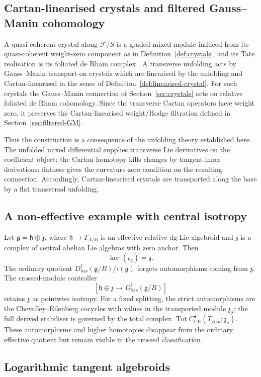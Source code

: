 \documentclass[11pt,reqno,a4paper,dvipsnames,x11names]{amsart}
\numberwithin{equation}{section}
\theoremstyle{plain}
\theoremstyle{definition}
\theoremstyle{remark}
\DeclareMathOperator{\Tot}{Tot}
\newcommand{\kk}{k}
\newcommand{\cF}{\mathcal F}
\newcommand{\g}{\mathfrak g}
\newcommand{\h}{\mathfrak h}
\newcommand{\z}{\mathfrak z}
\newcommand{\bas}{\mathrm{bas}}
\begin{document}
\subsection{Cartan-linearised crystals and filtered Gauss--Manin cohomology}

A quasi-coherent crystal along \(\cF/S\) is a graded-mixed module induced from its quasi-coherent weight-zero component as in Definition~\ref{def:crystals}, and its Tate realisation is its foliated de Rham complex \cite[Sections~3.1--3.2]{TV}. A transverse unfolding acts by Gauss--Manin transport on crystals which are linearised by the unfolding and Cartan-linearised in the sense of Definition~\ref{def:linearised-crystal}. For such crystals the Gauss--Manin connection of Section~\ref{sec:crystals} acts on relative foliated de Rham cohomology. Since the transverse Cartan operators have weight zero, it preserves the Cartan-linearised weight/Hodge filtration defined in Section~\ref{sec:filtered-GM}.

Thus the construction is a consequence of the unfolding theory established here. The unfolded mixed differential supplies transverse Lie derivatives on the coefficient object; the Cartan homotopy kills changes by tangent inner derivations; flatness gives the curvature-zero condition on the resulting connection. Accordingly, Cartan-linearised crystals are transported along the base by a flat transversal unfolding.

\subsection{A non-effective example with central isotropy}

Let \(\g=\h\oplus\z\), where \(\h\to T_{A/B}\) is an effective relative dg-Lie algebroid and \(\z\) is a complex of central abelian Lie algebras with zero anchor. Then
\[
 \ker(\iota_\g)=\z.
\]
The ordinary quotient \(D^1_{\bas}(\g/B)/\iota(\g)\) forgets automorphisms coming from \(\z\). The crossed-module controller
\[
 [\h\oplus\z\to D^1_{\bas}(\g/B)]
\]
retains \(\z\) as pointwise isotropy. For a fixed splitting, the strict automorphisms are the Chevalley--Eilenberg cocycles with values in the transported module \(\z_s\); the full derived stabiliser is governed by the total complex \(\Tot C^\bullet_{\mathrm{CE}}(T_{B/\kk};\z_s)\). These automorphisms and higher homotopies disappear from the ordinary effective quotient but remain visible in the crossed classification.

\subsection{Logarithmic tangent algebroids}
\end{document}
